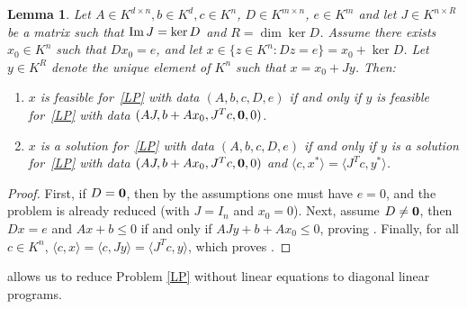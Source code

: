 \documentclass[a4paper,oneside,10pt]{article}
\newtheorem{lemma}[theorem]{Lemma}
\newcommand{\allmat}{\mathbb{M}} %
\newcommand{\OK}{\mathcal{O}_K}
\begin{document}
\begin{lemma}\label{reducD}
  Let $A \in K^{d \times n}, b \in K^d, c\in K^n$, $D \in K^{m\times n}$,
  $e \in K^m$ and let $J \in K^{n \times R}$ be a matrix such that
  ${\rm Im}\, J = \ker D$ and $R = \dim \ker D$.
  Assume there exists $x_0 \in K^n$ such that $D x_0 = e$, and let
  $x \in \{z \in K^n : Dz = e\} = x_0 + \ker D$.
  Let $y \in K^R$ denote the unique element of $K^n$ such that
  $x = x_0 + J y$. Then:
  \begin{enumerate}
  \item\label{reducD_item1}
    $x$ is feasible for~\eqref{LP} with data $(A,b,c,D,e)$ if and only if 
    $y$ is feasible for~\eqref{LP} with data $(AJ,b+A x_0,J^T c,{\bf 0},0)$.
  \item\label{reducD_item2}
    $x$ is a solution for~\eqref{LP} with data $(A,b,c,D,e)$ if and only if 
    $y$ is a solution for~\eqref{LP} with data $(AJ,b+A x_0,J^T c,{\bf 0},0)$ and
    $\langle c,x^* \rangle = \langle J^T c,y^* \rangle$.
  \end{enumerate}
\end{lemma}
\begin{proof}
  First, if $D={\bf 0}$, then by the assumptions one must have $e=0$, and the problem
  is already reduced (with $J=I_n$ and $x_0=0$).
  Next, assume $D\neq{\bf 0}$, then $Dx=e$ and $Ax + b \le 0$ if and only if
  $AJy + b+Ax_0 \le 0$, proving . Finally, for all
  $c \in K^n$, $\langle c,x\rangle = \langle c, Jy\rangle = \langle J^T c,y\rangle$, which proves .
\end{proof}
 

 allows us to reduce Problem \eqref{LP} without linear equations
to diagonal linear programs.
\end{document}
